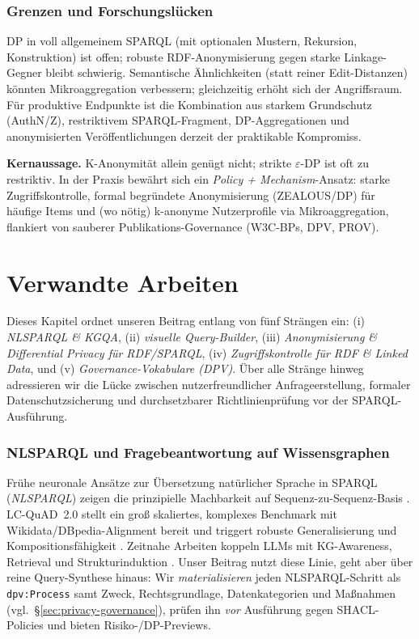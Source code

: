 \subsection{Grenzen und Forschungslücken}
DP in voll allgemeinem SPARQL (mit optionalen Mustern, Rekursion, Konstruktion) ist offen; robuste RDF-Anonymisierung gegen starke Linkage-Gegner bleibt schwierig. Semantische Ähnlichkeiten (statt reiner Edit-Distanzen) könnten Mikroaggregation verbessern; gleichzeitig erhöht sich der Angriffsraum. Für produktive Endpunkte ist die Kombination aus starkem Grundschutz (AuthN/Z), restriktivem SPARQL-Fragment, DP-Aggregationen und anonymisierten Veröffentlichungen derzeit der praktikable Kompromiss.

\medskip
\noindent\textbf{Kernaussage.} K-Anonymität allein genügt nicht; strikte $\varepsilon$-DP ist oft zu restriktiv. In der Praxis bewährt sich ein \emph{Policy + Mechanism}-Ansatz: starke Zugriffskontrolle, formal begründete Anonymisierung (ZEALOUS/DP) für häufige Items und (wo nötig) k-anonyme Nutzerprofile via Mikroaggregation, flankiert von sauberer Publikations-Governance (W3C-BPs, DPV, PROV).











\chapter{Verwandte Arbeiten}
\label{sec:related-work}

Dieses Kapitel ordnet unseren Beitrag entlang von fünf Strängen ein: (i) \emph{NL{\textrightarrow}SPARQL \& KGQA}, (ii) \emph{visuelle Query-Builder}, (iii) \emph{Anonymisierung \& Differential Privacy für RDF/SPARQL}, (iv) \emph{Zugriffskontrolle für RDF \& Linked Data}, und (v) \emph{Governance-Vokabulare (DPV)}. Über alle Stränge hinweg adressieren wir die Lücke zwischen nutzerfreundlicher Anfrageerstellung, formaler Datenschutzsicherung und durchsetzbarer Richtlinienprüfung vor der SPARQL-Ausführung.

\subsection{NL{\textrightarrow}SPARQL und Fragebeantwortung auf Wissensgraphen}
Frühe neuronale Ansätze zur Übersetzung natürlicher Sprache in SPARQL (\emph{NL{\textrightarrow}SPARQL}) zeigen die prinzipielle Machbarkeit auf Sequenz-zu-Sequenz-Basis \cite{yin-nmt-sparql}. LC-QuAD~2.0 stellt ein groß skaliertes, komplexes Benchmark mit Wikidata/DBpedia-Alignment bereit und triggert robuste Generalisierung und Kompositionsfähigkeit \cite{lcquad2}. Zeitnahe Arbeiten koppeln LLMs mit KG-Awareness, Retrieval und Strukturinduktion \cite{avila-kgqa-llm,pramanik-uniqorn}. 
Unser Beitrag nutzt diese Linie, geht aber über reine Query-Synthese hinaus: Wir \emph{materialisieren} jeden NL{\textrightarrow}SPARQL-Schritt als \texttt{dpv:Process} samt Zweck, Rechtsgrundlage, Datenkategorien und Maßnahmen (vgl.\ \S\ref{sec:privacy-governance}), prüfen ihn \emph{vor} Ausführung gegen SHACL-Policies und bieten Risiko-/DP-Previews.

